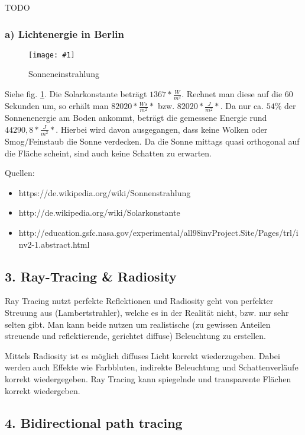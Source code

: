 \documentclass[a4paper,headings=small]{scrartcl}
\numberwithin{equation}{section} %
\numberwithin{figure}{section}   %
\newcommand{\image}[3]{
	\begin{figure}[htbp]
		\centering
		\texttt{[image: \#1]}
		\caption{#3}
		\label{fig:#1}
	\end{figure}
}
\begin{document}
TODO

\subsubsection*{a) Lichtenergie in Berlin}

\image{img/sonneneinstrahlung}{0.8}{Sonneneinstrahlung}

Siehe fig. \ref{fig:img/sonneneinstrahlung}.
Die Solarkonstante beträgt $1367 * \frac{W}{m^2}$. Rechnet man diese auf die 60 Sekunden um, so erhält man $82020 * \frac{Ws}{m^2}*$ bzw. $82020 * \frac{J}{m^2}*$.
Da nur ca. $54\%$ der Sonnenenergie am Boden ankommt, beträgt die gemessene Energie rund $44290,8* \frac{J}{m^2}*$.
Hierbei wird davon ausgegangen, dass keine Wolken oder Smog/Feinstaub die Sonne verdecken. Da die Sonne mittags quasi orthogonal auf die Fläche scheint,
sind auch keine Schatten zu erwarten.

Quellen:
\begin{itemize}
\item https://de.wikipedia.org/wiki/Sonnenstrahlung
\item http://de.wikipedia.org/wiki/Solarkonstante
\item http://education.gsfc.nasa.gov/experimental/all98invProject.Site/Pages/trl/inv2-1.abstract.html
\end{itemize}


\subsection*{3. Ray-Tracing \& Radiosity}

Ray Tracing nutzt perfekte Reflektionen und Radiosity geht von perfekter Streuung aus (Lambertstrahler), welche es in der Realität nicht, bzw. nur sehr selten gibt.
Man kann beide nutzen um realistische (zu gewissen Anteilen streuende und reflektierende, gerichtet diffuse) Beleuchtung zu erstellen.

Mittels Radiosity ist es möglich diffuses Licht korrekt wiederzugeben. Dabei werden auch Effekte wie Farbbluten, indirekte Beleuchtung und Schattenverläufe korrekt wiedergegeben. Ray Tracing kann spiegelnde und transparente Flächen korrekt wiedergeben.


\subsection*{4. Bidirectional path tracing}
\end{document}
